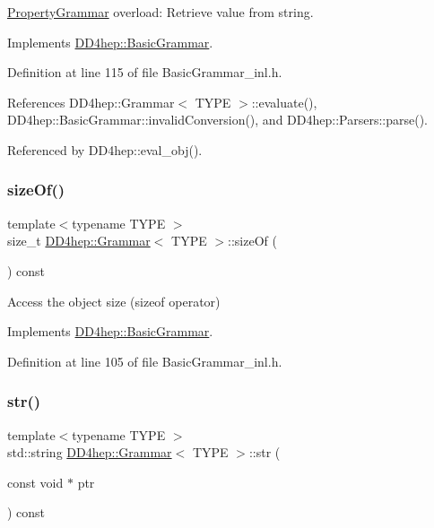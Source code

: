 \hyperlink{class_d_d4hep_1_1_property_grammar}{Property\+Grammar} overload\+: Retrieve value from string. 



Implements \hyperlink{class_d_d4hep_1_1_basic_grammar_adf08fd5e01cf623c8b0e239bbe0b1868}{D\+D4hep\+::\+Basic\+Grammar}.



Definition at line 115 of file Basic\+Grammar\+\_\+inl.\+h.



References D\+D4hep\+::\+Grammar$<$ T\+Y\+P\+E $>$\+::evaluate(), D\+D4hep\+::\+Basic\+Grammar\+::invalid\+Conversion(), and D\+D4hep\+::\+Parsers\+::parse().



Referenced by D\+D4hep\+::eval\+\_\+obj().

\hypertarget{class_d_d4hep_1_1_grammar_a12daedd346b5eec5a95c0081918d7e0b}{}\label{class_d_d4hep_1_1_grammar_a12daedd346b5eec5a95c0081918d7e0b} 
\subsubsection{\texorpdfstring{size\+Of()}{sizeOf()}}
{\footnotesize\ttfamily template$<$typename T\+Y\+PE $>$ \\
size\+\_\+t \hyperlink{class_d_d4hep_1_1_grammar}{D\+D4hep\+::\+Grammar}$<$ T\+Y\+PE $>$\+::size\+Of (\begin{DoxyParamCaption}{ }\end{DoxyParamCaption}) const\hspace{0.3cm}{\ttfamily [virtual]}}



Access the object size (sizeof operator) 



Implements \hyperlink{class_d_d4hep_1_1_basic_grammar_a5e2ae03f6371357d3da7e082bbeabb0d}{D\+D4hep\+::\+Basic\+Grammar}.



Definition at line 105 of file Basic\+Grammar\+\_\+inl.\+h.

\hypertarget{class_d_d4hep_1_1_grammar_a405a9e6504ed0c6dc5a774cf4839447c}{}\label{class_d_d4hep_1_1_grammar_a405a9e6504ed0c6dc5a774cf4839447c} 
\subsubsection{\texorpdfstring{str()}{str()}}
{\footnotesize\ttfamily template$<$typename T\+Y\+PE $>$ \\
std\+::string \hyperlink{class_d_d4hep_1_1_grammar}{D\+D4hep\+::\+Grammar}$<$ T\+Y\+PE $>$\+::str (\begin{DoxyParamCaption}\item[{const void $\ast$}]{ptr }\end{DoxyParamCaption}) const\hspace{0.3cm}{\ttfamily [virtual]}}



